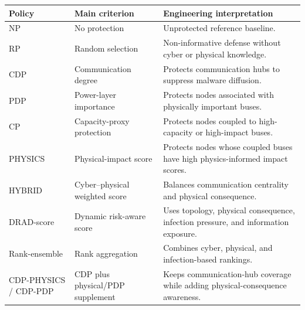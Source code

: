 \documentclass[10pt]{article}
\makeatletter
\newenvironment{threeparttable}{}{}
\newenvironment{exporttable}{\par\noindent\begin{minipage}{\linewidth}\def\@captype{table}}{\end{minipage}\par}
\makeatother
\begin{document}
\begin{exporttable}
\centering
\small
\begin{threeparttable}
\caption{Comprehensive candidate policy families. The number of executable candidates is state/variant dependent (8--12 in the separate rolling records).}
\label{tab:candidate_policies}
\begin{tabularx}{0.96\textwidth}{l l X}
\toprule
\rowcolor{TableHeader}
Policy & Main criterion & Engineering interpretation \\
\midrule
\rowcolor{RowWeak}
NP & No protection & Unprotected reference baseline. \\
\rowcolor{RowNeutral}
RP & Random selection & Non-informative defense without cyber or physical knowledge. \\
\rowcolor{RowBaseline}
CDP & Communication degree & Protects communication hubs to suppress malware diffusion. \\
\rowcolor{RowPhysical}
PDP & Power-layer importance & Protects nodes associated with physically important buses. \\
\rowcolor{RowPhysical}
CP & Capacity-proxy protection & Protects nodes coupled to high-capacity or high-impact buses. \\
\rowcolor{RowPhysical}
PHYSICS & Physical-impact score & Protects nodes whose coupled buses have high physics-informed impact scores. \\
\rowcolor{RowScenario}
HYBRID & Cyber--physical weighted score & Balances communication centrality and physical consequence. \\
\rowcolor{RowRisk}
DRAD-score & Dynamic risk-aware score & Uses topology, physical consequence, infection pressure, and information exposure. \\
\rowcolor{RowRisk}
Rank-ensemble & Rank aggregation & Combines cyber, physical, and infection-based rankings. \\
\rowcolor{RowProposed}
CDP-PHYSICS / CDP-PDP & CDP plus physical/PDP supplement & Keeps communication-hub coverage while adding physical-consequence awareness. \\
\bottomrule
\end{tabularx}
\end{threeparttable}
\end{exporttable}
\clearpage
\setcounter{table}{2}
\end{document}
